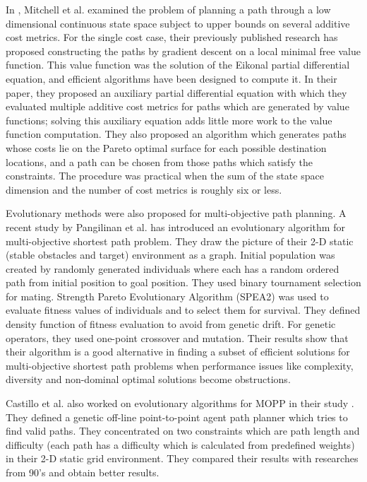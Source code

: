 In \cite{Mitchell:2009}, Mitchell et al. examined the problem of planning a path through a low dimensional continuous state space subject to upper bounds on several additive cost metrics. For the single cost case, their previously published research has proposed constructing the paths by gradient descent on a local minimal free value function. This value function was the solution of the Eikonal partial differential equation, and efficient algorithms have been designed to compute it. In their paper, they proposed an auxiliary partial differential equation with which they evaluated multiple additive cost metrics for paths which are generated by value functions; solving this auxiliary equation adds little more work to the value function computation. They also proposed an algorithm which generates paths whose costs lie on the Pareto optimal surface for each possible destination locations, and a path can be chosen from those paths which satisfy the constraints. The procedure was practical when the sum of the state space dimension and the number of cost metrics is roughly six or less.

Evolutionary methods were also proposed for multi-objective path planning. A recent study by Pangilinan et al. \cite{Pangilinan} has introduced an evolutionary algorithm for multi-objective shortest path problem. They draw the picture of their 2-D static (stable obstacles and target) environment as a graph. Initial population was created by randomly generated individuals where each has a random ordered path from initial position to goal position. They used binary tournament selection for mating. Strength Pareto Evolutionary Algorithm (SPEA2) \cite{spea2:2001} was used to evaluate fitness values of individuals and to select them for survival. They defined density function of fitness evaluation to avoid from genetic drift. For genetic operators, they used one-point crossover and mutation. Their results show that their algorithm is a good alternative in finding a subset of efficient solutions for multi-objective shortest path problems when performance issues like complexity, diversity and non-dominal optimal solutions become obstructions.

Castillo et al. also worked on evolutionary algorithms for MOPP in their study \cite{Castillo:2007}. They defined a genetic off-line point-to-point agent path planner which tries to find valid paths. They concentrated on two constraints which are path length and difficulty (each path has a difficulty which is calculated from predefined weights) in their 2-D static grid environment. They compared their results with researches from 90's and obtain better results.

